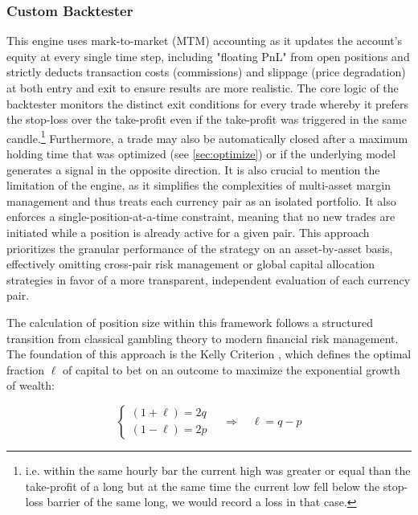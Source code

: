 \documentclass[12pt, a4paper]{article}
\begin{document}
\subsubsection{Custom Backtester}\label{sec:custom_backtester}

This engine uses mark-to-market (MTM) accounting as it updates the account's equity at every single time step, including "floating PnL" from open positions and strictly 
deducts transaction costs (commissions) and slippage (price degradation) at both entry and exit to ensure results are more realistic. 
The core logic of the backtester monitors the distinct exit conditions for every trade whereby it prefers the stop-loss over the take-profit 
even if the take-profit was triggered in the same candle.\footnote{i.e. within the same hourly bar the current high was greater or equal than the take-profit of a long 
but at the same time the current low fell below the stop-loss barrier of the same long, we would record a loss in that case.}
Furthermore, a trade may also be automatically closed after a maximum holding time that was optimized (see \ref{sec:optimize}) or if the underlying model generates a signal in the opposite direction.
It is also crucial to mention the limitation of the engine, as it simplifies the complexities of multi-asset margin management and thus treats each currency pair as an isolated portfolio. It
also enforces a single-position-at-a-time constraint, meaning that no new trades are initiated while a position is already active for a given pair. This approach prioritizes
the granular performance of the strategy on an asset-by-asset basis, effectively omitting cross-pair risk management or global capital allocation strategies in favor of a
more transparent, independent evaluation of each currency pair.

\medskip

The calculation of position size within this framework follows a structured transition from classical gambling theory to modern financial risk management. The foundation
of this approach is the Kelly Criterion \parencite[see][920]{Kelly1956}, which defines the optimal fraction \( \ell \) of capital to bet on an outcome to maximize the
exponential growth of wealth:

\begin{equation}
    \begin{cases}
        (1 + \ell) = 2q \\[4pt]
        (1 - \ell) = 2p
    \end{cases}
    \quad\Longrightarrow\quad
    \ell = q - p
\end{equation}
\end{document}
